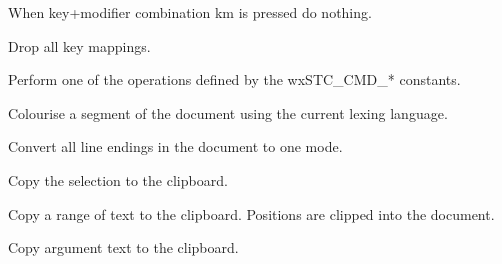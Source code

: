 
When key+modifier combination km is pressed do nothing.


\label{wxstyledtextctrlcmdkeyclearall}


Drop all key mappings.


\label{wxstyledtextctrlcmdkeyexecute}


Perform one of the operations defined by the wxSTC\_CMD\_* constants.


\label{wxstyledtextctrlcolourise}


Colourise a segment of the document using the current lexing language.


\label{wxstyledtextctrlconverteols}


Convert all line endings in the document to one mode.


\label{wxstyledtextctrlcopy}


Copy the selection to the clipboard.


\label{wxstyledtextctrlcopyrange}


Copy a range of text to the clipboard. Positions are clipped into the document.


\label{wxstyledtextctrlcopytext}


Copy argument text to the clipboard.


\label{wxstyledtextctrlcreate}



